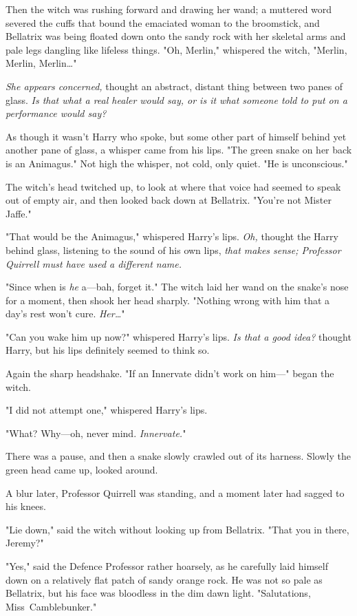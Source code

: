 Then the witch was rushing forward and drawing her wand; a muttered word
severed the cuffs that bound the emaciated woman to the broomstick, and
Bellatrix was being floated down onto the sandy rock with her skeletal arms and
pale legs dangling like lifeless things. "Oh, Merlin," whispered the witch,
"Merlin, Merlin, Merlin…"

\emph{She appears concerned,} thought an abstract, distant thing between two
panes of glass. \emph{Is that what a real healer would say, or is it what
someone told to put on a performance would say?}

As though it wasn’t Harry who spoke, but some other part of himself behind yet
another pane of glass, a whisper came from his lips. "The green snake on her
back is an Animagus." Not high the whisper, not cold, only quiet. "He is
unconscious."

The witch’s head twitched up, to look at where that voice had seemed to speak
out of empty air, and then looked back down at Bellatrix. "You’re not Mister
Jaffe."

"That would be the Animagus," whispered Harry’s lips. \emph{Oh,} thought the
Harry behind glass, listening to the sound of his own lips, \emph{that makes
sense; Professor Quirrell must have used a different name.}

"Since when is \emph{he} a—bah, forget it." The witch laid her wand on the
snake’s nose for a moment, then shook her head sharply. "Nothing wrong with him
that a day’s rest won’t cure. \emph{Her…}"

"Can you wake him up now?" whispered Harry’s lips. \emph{Is that a good idea?}
thought Harry, but his lips definitely seemed to think so.

Again the sharp headshake. "If an Innervate didn’t work on him—" began the
witch.

"I did not attempt one," whispered Harry’s lips.

"What? Why—oh, never mind. \emph{Innervate.}"

There was a pause, and then a snake slowly crawled out of its harness. Slowly
the green head came up, looked around.

A blur later, Professor Quirrell was standing, and a moment later had sagged to
his knees.

"Lie down," said the witch without looking up from Bellatrix. "That you in
there, Jeremy?"

"Yes," said the Defence Professor rather hoarsely, as he carefully laid himself
down on a relatively flat patch of sandy orange rock. He was not so pale as
Bellatrix, but his face was bloodless in the dim dawn light. "Salutations,
Miss~Camblebunker."

